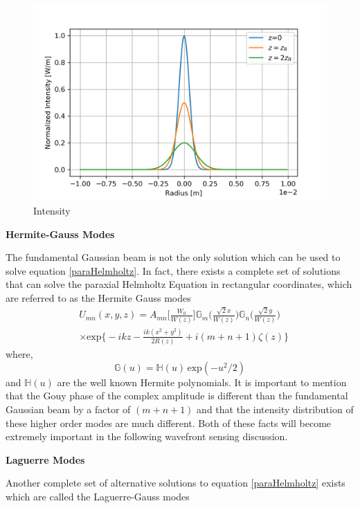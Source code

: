 		\begin{figure}[ht]
			\centering
			\includegraphics[width=0.65 \textwidth]{../Figures/GaussBeamIntensity.png}
			\caption{Intensity}
			\label{fig:GaussIntensity}
		\end{figure}
		
		\textbf{Hermite-Gauss Modes}
		
		The fundamental Gaussian beam is not the only solution which can be used to solve equation \ref{paraHelmholtz}.  In fact, there exists a complete set of solutions that can solve the paraxial Helmholtz Equation in rectangular coordinates, which are referred to as the Hermite Gauss modes
		\begin{equation}\label{HG}
		\begin{aligned}
		&U_{mn}(x,y,z) = A_{mn}\bigg[ \frac{W_0}{W(z)} \bigg] \mathbb{G}_m\Bigg( \frac{\sqrt{2}x}{W(z)}  \Bigg) \mathbb{G}_n\Bigg( \frac{\sqrt{2}y}{W(z)} \Bigg)\\
		&\times \text{exp} \bigg\{ -ikz - \frac{ik(x^2+y^2)}{2R(z)} + i(m+n+1)\zeta(z) \bigg\}
		\end{aligned}
		\end{equation}
		where,
		\begin{equation}
		\mathbb{G}(u) = \mathbb{H}(u) \, \text{exp}(-u^2/2)
		\end{equation}
		and $ \mathbb{H}(u)$ are the well known Hermite polynomials.  It is important to mention that the Gouy phase of the complex amplitude is different than the fundamental Gaussian beam by a factor of $(m + n + 1)$ and that the intensity distribution of these higher order modes are much different. Both of these facts will become extremely important in the following wavefront sensing discussion.
	
		\textbf{Laguerre Modes}
		
		Another complete set of alternative solutions to equation \ref{paraHelmholtz} exists which are called the Laguerre-Gauss modes
		
